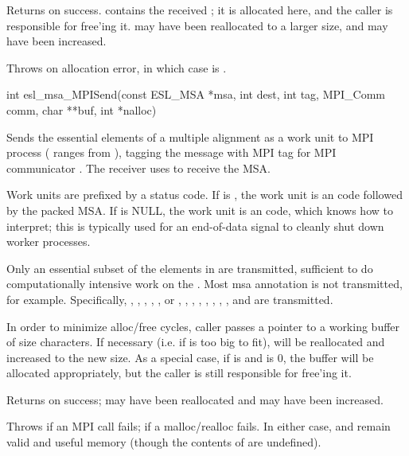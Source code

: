 \begin{sreapi}
Returns  on success.  contains the received ;
it is allocated here, and the caller is responsible for
free'ing it.   may have been reallocated to a
larger size, and  may have been increased. 

Throws  on allocation error, in which case  is 
.           


\hypertarget{func:esl_msa_MPISend()}
{\item[int esl\_msa\_MPISend(const ESL\_MSA *msa, int dest, int tag, MPI\_Comm comm, char **buf, int *nalloc)]}

Sends the essential elements of a multiple alignment  
as a work unit to MPI process  ( ranges from ),
tagging the message with MPI tag  for MPI communicator
. The receiver uses  to receive the MSA.

Work units are prefixed by a status code. If  is
, the work unit is an  code followed by
the packed MSA. If  is NULL, the work unit is an
 code, which  knows how
to interpret; this is typically used for an end-of-data
signal to cleanly shut down worker processes.

Only an essential subset of the elements in  are
transmitted, sufficient to do computationally intensive
work on the . Most msa annotation is not
transmitted, for example. Specifically, , ,
, , ,  or , , ,
, , , , , and 
are transmitted.

In order to minimize alloc/free cycles, caller passes a
pointer to a working buffer  of size 
characters. If necessary (i.e. if  is too big to
fit),  will be reallocated and  increased
to the new size. As a special case, if  is 
and  is 0, the buffer will be allocated
appropriately, but the caller is still responsible for
free'ing it.

Returns  on success;  may have been reallocated and
 may have been increased.

Throws  if an MPI call fails;  if a malloc/realloc
fails. In either case,  and  remain valid and useful
memory (though the contents of  are undefined). 




\end{sreapi}
